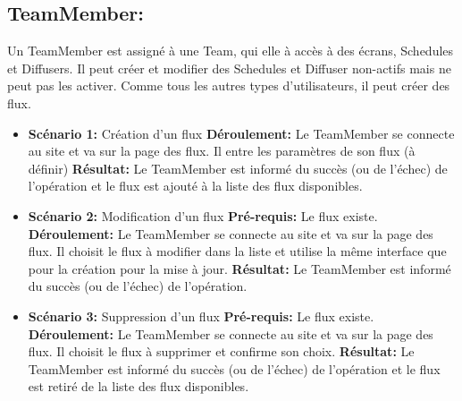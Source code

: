 \documentclass[french]{article}
\begin{document}
\begin{itemize}
		\end{itemize}
		
		
	\subsection{TeamMember:} 
	Un TeamMember est assigné à une Team, qui elle à accès à des écrans, Schedules et Diffusers. Il peut créer et modifier des Schedules et Diffuser non-actifs mais ne peut pas les activer. Comme tous les autres types d'utilisateurs, il peut créer des flux. \newline
		\begin{itemize}
			\item \textbf{Scénario 1:} Création d'un flux\newline
			\textbf{Déroulement:} Le TeamMember se connecte au site et va sur la page des flux. Il entre les paramètres de son flux (à définir) \newline
			\textbf{Résultat:} Le TeamMember est informé du succès (ou de l'échec) de l'opération et le flux est ajouté à la liste des flux disponibles.\newline
			
			\item \textbf{Scénario 2:} Modification d'un flux\newline
			\textbf{Pré-requis:} Le flux existe.\newline
			\textbf{Déroulement:} Le TeamMember se connecte au site et va sur la page des flux. Il choisit le flux à modifier dans la liste et utilise la même interface que pour la création pour la mise à jour. \newline
			\textbf{Résultat:} Le TeamMember est informé du succès (ou de l'échec) de l'opération.\newline
			
			\item \textbf{Scénario 3:} Suppression d'un flux\newline
			\textbf{Pré-requis:} Le flux existe.\newline
			\textbf{Déroulement:} Le TeamMember se connecte au site et va sur la page des flux. Il choisit le flux à supprimer et confirme son choix.\newline
			\textbf{Résultat:} Le TeamMember est informé du succès (ou de l'échec) de l'opération et le flux est retiré de la liste des flux disponibles.\newline
			

\end{itemize}
\end{document}
